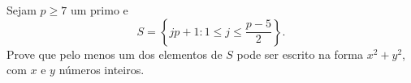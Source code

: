 Sejam $p \ge 7$ um primo e $$ S = \left\{ jp + 1 : 1 \le j \le \frac{p-5}{2} \right\}. $$
Prove que pelo menos um dos elementos de $S$ pode ser escrito na forma $x^2 + y^2$, com $x$ e $y$ números inteiros.